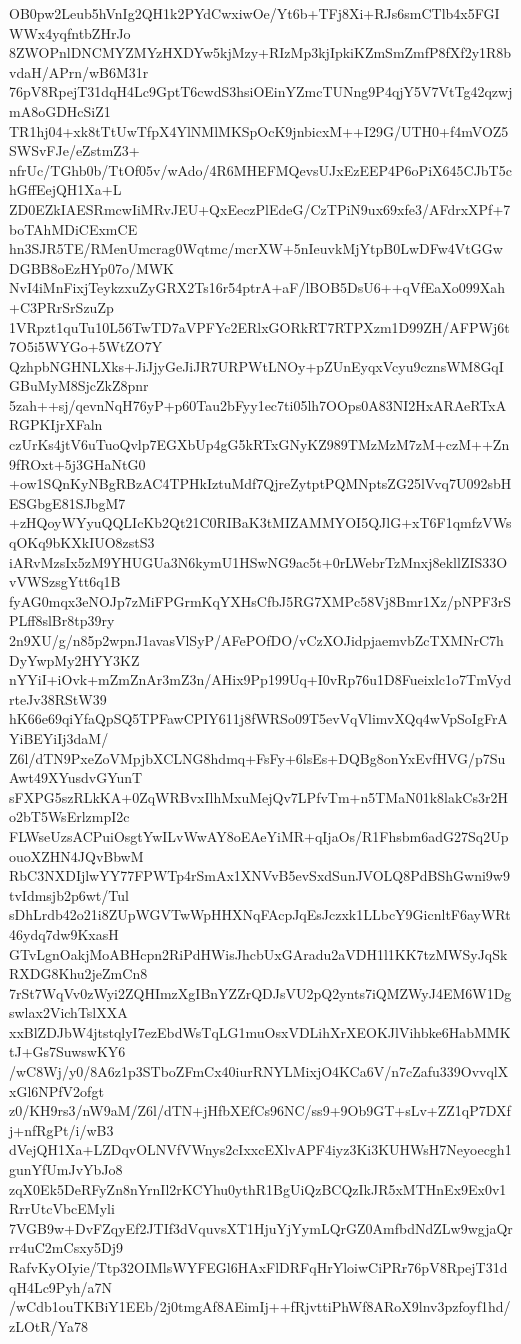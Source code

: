 OB0pw2Leub5hVnIg2QH1k2PYdCwxiwOe/Yt6b+TFj8Xi+RJs6smCTlb4x5FGIWWx4yqfntbZHrJo
8ZWOPnlDNCMYZMYzHXDYw5kjMzy+RIzMp3kjIpkiKZmSmZmfP8fXf2y1R8bvdaH/APrn/wB6M31r
76pV8RpejT31dqH4Lc9GptT6cwdS3hsiOEinYZmcTUNng9P4qjY5V7VtTg42qzwjmA8oGDHcSiZ1
TR1hj04+xk8tTtUwTfpX4YlNMlMKSpOcK9jnbicxM++I29G/UTH0+f4mVOZ5SWSvFJe/eZstmZ3+
nfrUc/TGhb0b/TtOf05v/wAdo/4R6MHEFMQevsUJxEzEEP4P6oPiX645CJbT5chGffEejQH1Xa+L
ZD0EZkIAESRmcwIiMRvJEU+QxEeczPlEdeG/CzTPiN9ux69xfe3/AFdrxXPf+7boTAhMDiCExmCE
hn3SJR5TE/RMenUmcrag0Wqtmc/mcrXW+5nIeuvkMjYtpB0LwDFw4VtGGwDGBB8oEzHYp07o/MWK
NvI4iMnFixjTeykzxuZyGRX2Ts16r54ptrA+aF/lBOB5DsU6++qVfEaXo099Xah+C3PRrSrSzuZp
1VRpzt1quTu10L56TwTD7aVPFYc2ERlxGORkRT7RTPXzm1D99ZH/AFPWj6t7O5i5WYGo+5WtZO7Y
QzhpbNGHNLXks+JiJjyGeJiJR7URPWtLNOy+pZUnEyqxVcyu9cznsWM8GqIGBuMyM8SjcZkZ8pnr
5zah++sj/qevnNqH76yP+p60Tau2bFyy1ec7ti05lh7OOps0A83NI2HxARAeRTxARGPKIjrXFaln
czUrKs4jtV6uTuoQvlp7EGXbUp4gG5kRTxGNyKZ989TMzMzM7zM+czM++Zn9fROxt+5j3GHaNtG0
+ow1SQnKyNBgRBzAC4TPHkIztuMdf7QjreZytptPQMNptsZG25lVvq7U092sbHESGbgE81SJbgM7
+zHQoyWYyuQQLIcKb2Qt21C0RIBaK3tMIZAMMYOI5QJlG+xT6F1qmfzVWsqOKq9bKXkIUO8zstS3
iARvMzsIx5zM9YHUGUa3N6kymU1HSwNG9ac5t+0rLWebrTzMnxj8ekllZIS33OvVWSzsgYtt6q1B
fyAG0mqx3eNOJp7zMiFPGrmKqYXHsCfbJ5RG7XMPc58Vj8Bmr1Xz/pNPF3rSPLff8slBr8tp39ry
2n9XU/g/n85p2wpnJ1avasVlSyP/AFePOfDO/vCzXOJidpjaemvbZcTXMNrC7hDyYwpMy2HYY3KZ
nYYiI+iOvk+mZmZnAr3mZ3n/AHix9Pp199Uq+I0vRp76u1D8Fueixlc1o7TmVydrteJv38RStW39
hK66e69qiYfaQpSQ5TPFawCPIY611j8fWRSo09T5evVqVlimvXQq4wVpSoIgFrAYiBEYiIj3daM/
Z6l/dTN9PxeZoVMpjbXCLNG8hdmq+FsFy+6lsEs+DQBg8onYxEvfHVG/p7SuAwt49XYusdvGYunT
sFXPG5szRLkKA+0ZqWRBvxIlhMxuMejQv7LPfvTm+n5TMaN01k8lakCs3r2Ho2bT5WsErlzmpI2c
FLWseUzsACPuiOsgtYwILvWwAY8oEAeYiMR+qIjaOs/R1Fhsbm6adG27Sq2UpouoXZHN4JQvBbwM
RbC3NXDIjlwYY77FPWTp4rSmAx1XNVvB5evSxdSunJVOLQ8PdBShGwni9w9tvIdmsjb2p6wt/Tul
sDhLrdb42o21i8ZUpWGVTwWpHHXNqFAcpJqEsJczxk1LLbcY9GicnltF6ayWRt46ydq7dw9KxasH
GTvLgnOakjMoABHcpn2RiPdHWisJhcbUxGAradu2aVDH1l1KK7tzMWSyJqSkRXDG8Khu2jeZmCn8
7rSt7WqVv0zWyi2ZQHImzXgIBnYZZrQDJsVU2pQ2ynts7iQMZWyJ4EM6W1Dgswlax2VichTslXXA
xxBlZDJbW4jtstqlyI7ezEbdWsTqLG1muOsxVDLihXrXEOKJlVihbke6HabMMKtJ+Gs7SuwswKY6
/wC8Wj/y0/8A6z1p3STboZFmCx40iurRNYLMixjO4KCa6V/n7cZafu339OvvqlXxGl6NPfV2ofgt
z0/KH9rs3/nW9aM/Z6l/dTN+jHfbXEfCs96NC/ss9+9Ob9GT+sLv+ZZ1qP7DXfj+nfRgPt/i/wB3
dVejQH1Xa+LZDqvOLNVfVWnys2cIxxcEXlvAPF4iyz3Ki3KUHWsH7Neyoecgh1gunYfUmJvYbJo8
zqX0Ek5DeRFyZn8nYrnIl2rKCYhu0ythR1BgUiQzBCQzIkJR5xMTHnEx9Ex0v1RrrUtcVbcEMyli
7VGB9w+DvFZqyEf2JTIf3dVquvsXT1HjuYjYymLQrGZ0AmfbdNdZLw9wgjaQrrr4uC2mCsxy5Dj9
RafvKyOIyie/Ttp32OIMlsWYFEGl6HAxFlDRFqHrYloiwCiPRr76pV8RpejT31dqH4Lc9Pyh/a7N
/wCdb1ouTKBiY1EEb/2j0tmgAf8AEimIj++fRjvttiPhWf8ARoX9lnv3pzfoyf1hd/zLOtR/Ya78
